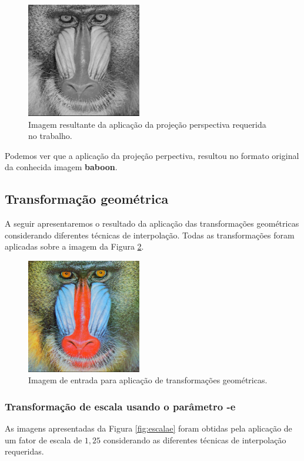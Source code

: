 \documentclass{article}
\begin{document}
\begin{figure}[!htp]%
	\centering
	\includegraphics[width=5cm]{baboon_perspectiva_result.png}
	\caption{Imagem resultante da aplicação da projeção perspectiva requerida no trabalho.}%
	\label{fig:projpersres}%
\end{figure}

\noindent
Podemos ver que a aplicação da projeção perpectiva, resultou no formato original da conhecida imagem \textbf{baboon}.


\subsection{Transformação geométrica}
A seguir apresentaremos o resultado da aplicação das transformações geométricas considerando diferentes técnicas de interpolação. Todas as transformações foram aplicadas sobre a imagem da Figura \ref{fig:projgeoini}.

\begin{figure}[!htp]%
	\centering
	\includegraphics[width=5cm]{baboon.png}
	\caption{Imagem de entrada para aplicação de transformações geométricas.}%
	\label{fig:projgeoini}%
\end{figure}

\newpage
\subsubsection{Transformação de escala usando o parâmetro -e}
As imagens apresentadas da Figura \ref{fig:escalae} foram obtidas pela aplicação de um fator de escala de $1,25$ considerando as diferentes técnicas de interpolação requeridas.
\end{document}
